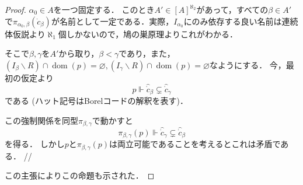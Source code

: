 \documentclass[uplatex,dvipdfmx]{jsarticle}
\newcommand{\dom}{\operatorname{dom}}
\newcommand\forces{\Vdash}
\renewcommand\emptyset{\varnothing}
\renewcommand{\setminus}{\smallsetminus}
\theoremstyle{definition}
\begin{document}
\begin{proof}
		$\alpha_0 \in A$を一つ固定する．
		このとき$A' \in [A]^{\aleph_2}$があって，すべての$\beta \in A'$で$\pi_{\alpha_0,\beta}(\dot{c}_\beta)$が名前として一定である．実際，$I_{\alpha_0}$にのみ依存する良い名前は連続体仮説より$\aleph_1$個しかないので，鳩の巣原理よりこれがわかる．
		
		そこで$\beta, \gamma$を$A'$から取り，$\beta < \gamma$であり，また，$(I_\beta \setminus R) \cap \dom(p) = \emptyset, (I_\gamma \setminus R) \cap \dom(p) = \emptyset$なようにする．
		今，最初の仮定より
		\[
		p \forces \hat{\dot{c}}_\beta \subsetneq \hat{\dot{c}}_\gamma
		\]
		である (ハット記号はBorelコードの解釈を表す)．
		
		この強制関係を同型$\pi_{\beta,\gamma}$で動かすと
		\[
		\pi_{\beta,\gamma}(p) \forces \hat{\dot{c}}_\gamma \subsetneq \hat{\dot{c}}_\beta
		\]
		を得る．
		しかし$p$と$\pi_{\beta,\gamma}(p)$は両立可能であることを考えるとこれは矛盾である． \hfill //
		
		この主張によりこの命題も示された．
	\end{proof}
	
	\nocite{*}
	\printbibliography[title={参考文献}]
\end{document}
